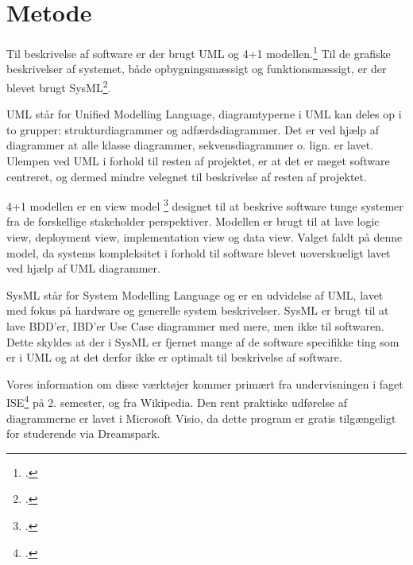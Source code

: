 \section{Metode}

Til beskrivelse af software er der brugt UML og 4+1 modellen.\footcite{4+1} Til de grafiske beskrivelser af systemet, både opbygningsmæssigt og funktionsmæssigt, er der blevet brugt SysML\footcite{SysML}.

UML står for Unified Modelling Language, diagramtyperne i UML kan deles op i to grupper: strukturdiagrammer og adfærdsdiagrammer. Det er ved hjælp af diagrammer at alle klasse diagrammer, sekvensdiagrammer o. lign. er lavet. Ulempen ved UML i forhold til resten af projektet, er at det er meget software centreret, og dermed mindre velegnet til beskrivelse af resten af projektet. 

4+1 modellen er en view model \footcite{viewmodel} designet til at beskrive software tunge systemer fra de forskellige stakeholder perspektiver. Modellen er brugt til at lave logic view, deployment view, implementation view og data view. Valget faldt på denne model, da systems kompleksitet i forhold til software blevet uoverskueligt lavet ved hjælp af UML diagrammer.

SysML står for System Modelling Language og er en udvidelse af UML, lavet med fokus på hardware og generelle system beskrivelser. SysML er brugt til at lave BDD’er, IBD’er Use Case diagrammer med mere, men ikke til softwaren. Dette skyldes at der i SysML er fjernet mange af de software specifikke ting som er i UML og at det derfor ikke er optimalt til beskrivelse af software.

Vores information om disse værktøjer kommer primært fra undervisningen i faget ISE\footcite{ise} på 2. semester, og fra Wikipedia. Den rent praktiske udførelse af diagrammerne er lavet i Microsoft Visio, da dette program er gratis tilgængeligt for studerende via Dreamspark.